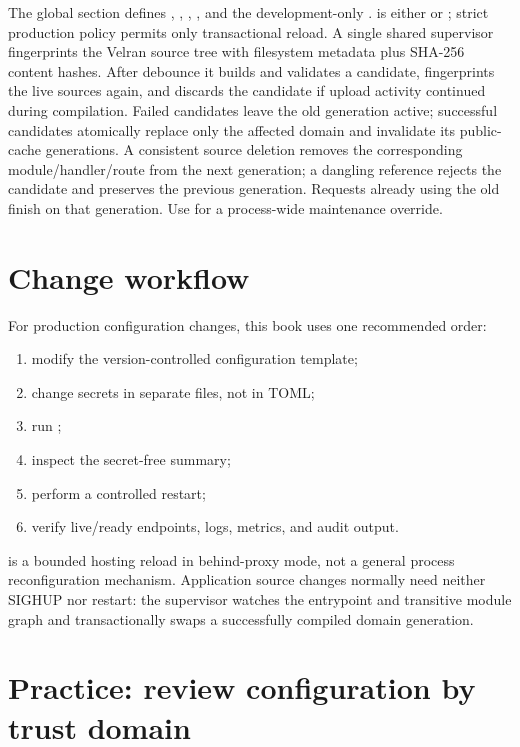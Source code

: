 The global \code{[reload]} section defines , , , , and the development-only .  is either  or ; strict production policy permits only transactional  reload. A single shared supervisor fingerprints the Velran source tree with filesystem metadata plus SHA-256 content hashes. After debounce it builds and validates a candidate, fingerprints the live sources again, and discards the candidate if upload activity continued during compilation. Failed candidates leave the old generation active; successful candidates atomically replace only the affected domain and invalidate its public-cache generations. A consistent source deletion removes the corresponding module/handler/route from the next generation; a dangling reference rejects the candidate and preserves the previous generation. Requests already using the old  finish on that generation. Use  for a process-wide maintenance override.

\section{Change workflow}

For production configuration changes, this book uses one recommended order:

\begin{enumerate}
  \item modify the version-controlled configuration template;
  \item change secrets in separate files, not in TOML;
  \item run ;
  \item inspect the secret-free  summary;
  \item perform a controlled restart;
  \item verify live/ready endpoints, logs, metrics, and audit output.
\end{enumerate}

 is a bounded hosting reload in behind-proxy mode, not a general process reconfiguration mechanism. Application source changes normally need neither SIGHUP nor restart: the \code{[reload]} supervisor watches the entrypoint and transitive module graph and transactionally swaps a successfully compiled domain generation.

\section{Practice: review configuration by trust domain}
